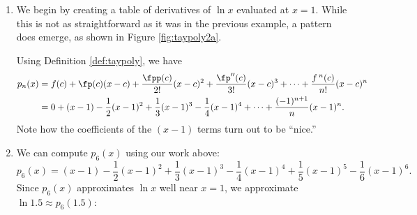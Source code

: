 {\begin{enumerate}
\item		We begin by creating a table of derivatives of $\ln x$ evaluated at $x=1$. While this is not as straightforward as it was in the previous example, a pattern does emerge, as shown in Figure \ref{fig:taypoly2a}.

Using Definition \ref{def:taypoly}, we have \small
\begin{align*}
	p_n(x) &=	f(c) + \fp(c)(x-c) + \frac{\fpp(c)}{2!}(x-c)^2+\frac{\fp''(c)}{3!}(x-c)^3+\cdots+\frac{f\,^n(c)}{n!}(x-c)^n\\
					&= 0+(x-1)-\frac12(x-1)^2+\frac13(x-1)^3-\frac14(x-1)^4+\cdots+\frac{(-1)^{n+1}}{n}(x-1)^n.
\end{align*}
\normalsize
Note how the coefficients of the $(x-1)$ terms turn out to be ``nice.''

\item		We can compute $p_6(x)$ using our work above:
$$p_6(x) = (x-1)-\frac12(x-1)^2+\frac13(x-1)^3-\frac14(x-1)^4+\frac15(x-1)^5-\frac16(x-1)^6.$$
Since $p_6(x)$ approximates $\ln x$ well near $x=1$, we approximate $\ln 1.5 \approx p_6(1.5)$:


\end{enumerate}}

